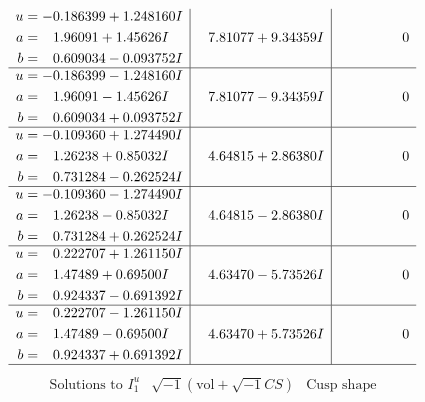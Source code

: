 \documentclass[1p]{elsarticle_modified}
\theoremstyle{definition}
\newcommand{\I}{\sqrt{-1}}
\begin{document}
$$\begin{array}{c|c|c}
\begin{aligned}
u &= -0.186399 + 1.248160 I \\
a &= \phantom{-}1.96091 + 1.45626 I \\
b &= \phantom{-}0.609034 - 0.093752 I\end{aligned}
 & \phantom{-}7.81077 + 9.34359 I & \phantom{-0.000000 } 0 \\ \hline\begin{aligned}
u &= -0.186399 - 1.248160 I \\
a &= \phantom{-}1.96091 - 1.45626 I \\
b &= \phantom{-}0.609034 + 0.093752 I\end{aligned}
 & \phantom{-}7.81077 - 9.34359 I & \phantom{-0.000000 } 0 \\ \hline\begin{aligned}
u &= -0.109360 + 1.274490 I \\
a &= \phantom{-}1.26238 + 0.85032 I \\
b &= \phantom{-}0.731284 - 0.262524 I\end{aligned}
 & \phantom{-}4.64815 + 2.86380 I & \phantom{-0.000000 } 0 \\ \hline\begin{aligned}
u &= -0.109360 - 1.274490 I \\
a &= \phantom{-}1.26238 - 0.85032 I \\
b &= \phantom{-}0.731284 + 0.262524 I\end{aligned}
 & \phantom{-}4.64815 - 2.86380 I & \phantom{-0.000000 } 0 \\ \hline\begin{aligned}
u &= \phantom{-}0.222707 + 1.261150 I \\
a &= \phantom{-}1.47489 + 0.69500 I \\
b &= \phantom{-}0.924337 - 0.691392 I\end{aligned}
 & \phantom{-}4.63470 - 5.73526 I & \phantom{-0.000000 } 0 \\ \hline\begin{aligned}
u &= \phantom{-}0.222707 - 1.261150 I \\
a &= \phantom{-}1.47489 - 0.69500 I \\
b &= \phantom{-}0.924337 + 0.691392 I\end{aligned}
 & \phantom{-}4.63470 + 5.73526 I & \phantom{-0.000000 } 0\\
 \hline 
 \end{array}$$\newpage$$\begin{array}{c|c|c}  
\text{Solutions to }I^u_{1}& \I (\text{vol} + \sqrt{-1}CS) & \text{Cusp shape}\\

\end{array}$$
\end{document}
